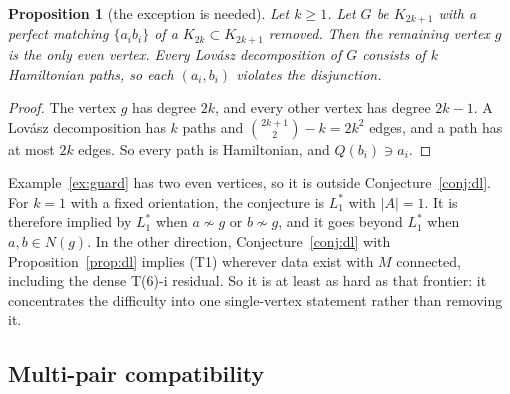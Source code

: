 \documentclass[11pt]{amsart}
\newtheorem{proposition}[theorem]{Proposition}
\theoremstyle{definition}
\begin{document}
\begin{proposition}[the exception is needed]\label{prop:twins}
Let $k\ge1$. Let $G$ be $K_{2k+1}$ with a perfect matching $\{a_ib_i\}$ of a $K_{2k}\subset K_{2k+1}$
removed. Then the remaining vertex $g$ is the only even vertex. Every Lov\'asz decomposition of $G$
consists of $k$ Hamiltonian paths, so each $(a_i,b_i)$ violates the disjunction.
\end{proposition}

\begin{proof}
The vertex $g$ has degree $2k$, and every other vertex has degree $2k-1$. A Lov\'asz decomposition
has $k$ paths and $\binom{2k+1}2-k=2k^2$ edges, and a path has at most $2k$ edges. So every path is
Hamiltonian, and $Q(b_i)\ni a_i$.
\end{proof}

Example~\ref{ex:guard} has two even vertices, so it is outside Conjecture~\ref{conj:dl}. For $k=1$
with a fixed orientation, the conjecture is $L_1^*$ with $|A|=1$. It is therefore implied by $L_1^*$
when $a\not\sim g$ or $b\not\sim g$, and it goes beyond $L_1^*$ when $a,b\in N(g)$. In the other
direction, Conjecture~\ref{conj:dl} with Proposition~\ref{prop:dl} implies (T1) wherever data exist
with $M$ connected, including the dense T(6)-i residual. So it is at least as hard as that frontier:
it concentrates the difficulty into one single-vertex statement rather than removing it.

\subsection{Multi-pair compatibility}
\end{document}
